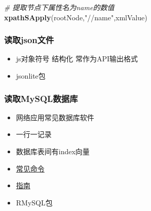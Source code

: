 \documentclass[
]{book}
\newenvironment{Shaded}{\begin{snugshade}}{\end{snugshade}}
\newcommand{\CommentTok}[1]{\textcolor[rgb]{0.56,0.35,0.01}{\textit{#1}}}
\newcommand{\DataTypeTok}[1]{\textcolor[rgb]{0.13,0.29,0.53}{#1}}
\newcommand{\KeywordTok}[1]{\textcolor[rgb]{0.13,0.29,0.53}{\textbf{#1}}}
\newcommand{\NormalTok}[1]{#1}
\newcommand{\OperatorTok}[1]{\textcolor[rgb]{0.81,0.36,0.00}{\textbf{#1}}}
\newcommand{\OtherTok}[1]{\textcolor[rgb]{0.56,0.35,0.01}{#1}}
\newcommand{\StringTok}[1]{\textcolor[rgb]{0.31,0.60,0.02}{#1}}
\providecommand{\tightlist}{%
  \setlength{\itemsep}{0pt}\setlength{\parskip}{0pt}}
\begin{document}
\begin{Shaded}
\begin{Highlighting}[]
\CommentTok{# 提取节点下属性名为name的数值}
\KeywordTok{xpathSApply}\NormalTok{(rootNode,}\StringTok{"//name"}\NormalTok{,xmlValue)}
\end{Highlighting}
\end{Shaded}

\hypertarget{ux8bfbux53d6jsonux6587ux4ef6}{%
\subsubsection{读取json文件}\label{ux8bfbux53d6jsonux6587ux4ef6}}

\begin{itemize}
\tightlist
\item
  js对象符号 结构化 常作为API输出格式
\item
  jsonlite包
\end{itemize}

\begin{Shaded}
\end{Shaded}

\hypertarget{ux8bfbux53d6mysqlux6570ux636eux5e93}{%
\subsubsection{读取MySQL数据库}\label{ux8bfbux53d6mysqlux6570ux636eux5e93}}

\begin{itemize}
\tightlist
\item
  网络应用常见数据库软件
\item
  一行一记录
\item
  数据库表间有index向量
\item
  \href{http://www.pantz.org/software/mysql/mysqlcommands.html}{常见命令}
\item
  \href{http://www.r-bloggers.com/mysql-and-r/}{指南}
\item
  RMySQL包
\end{itemize}
\end{document}
